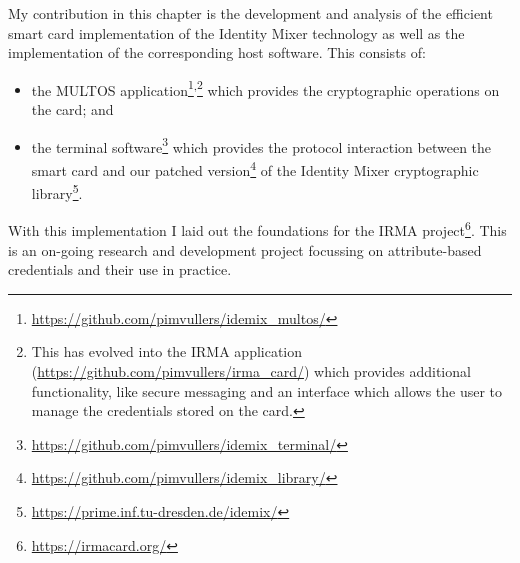 My contribution in this chapter is the development and analysis of the efficient
smart card implementation of the Identity Mixer technology as well as the
implementation of the corresponding host software. This consists of:
\begin{itemize}
  \item the MULTOS application\footnote{\url{https://github.com/pimvullers/idemix_multos/}
    }\textsuperscript{,}\footnote{This has evolved into the IRMA application
    (\url{https://github.com/pimvullers/irma_card/}) which provides additional
    functionality, like secure messaging and an interface which allows the user
    to manage the credentials stored on the card.}
    which provides the cryptographic operations on the card; and
  \item the terminal software\footnote{\url{https://github.com/pimvullers/idemix_terminal/}}
    which provides the protocol interaction between the smart card and our
    patched version\footnote{\url{https://github.com/pimvullers/idemix_library/}}
    of the Identity Mixer cryptographic library\footnote{\url{https://prime.inf.tu-dresden.de/idemix/}}.
\end{itemize}

With this implementation I laid out the foundations %
for the IRMA project\footnote{\url{https://irmacard.org/}}. This is an on-going
research and development project focussing on attribute-based credentials and
their use in practice.